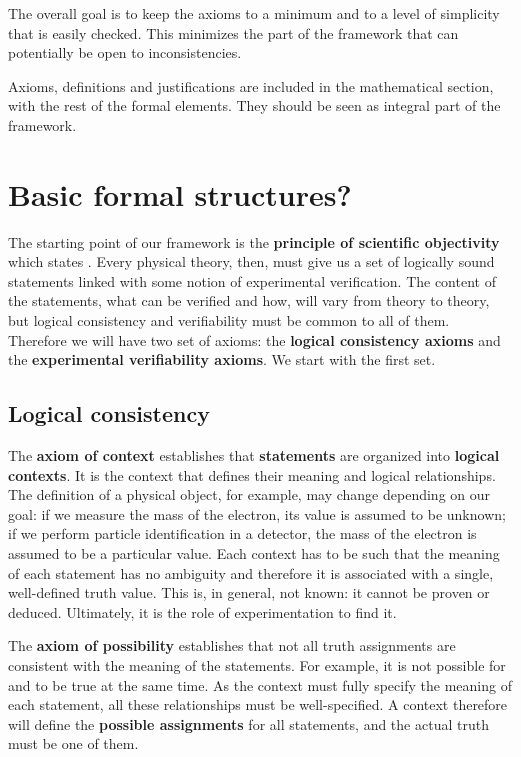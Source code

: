 \documentclass[twocolumn]{article}
\begin{document}
The overall goal is to keep the axioms to a minimum and to a level of simplicity that is easily checked. This minimizes the part of the framework that can potentially be open to inconsistencies.

Axioms, definitions and justifications are included in the mathematical section, with the rest of the formal elements. They should be seen as integral part of the framework.

\section{Basic formal structures?}

The starting point of our framework is the \textbf{principle of scientific objectivity} which states . Every physical theory, then, must give us a set of logically sound statements linked with some notion of experimental verification. The content of the statements, what can be verified and how, will vary from theory to theory, but logical consistency and verifiability must be common to all of them. Therefore we will have two set of axioms: the \textbf{logical consistency axioms} and the \textbf{experimental verifiability axioms}. We start with the first set.

\subsection{Logical consistency}

The \textbf{axiom of context} establishes that \textbf{statements} are organized into \textbf{logical contexts}. It is the context that defines their meaning and logical relationships. The definition of a physical object, for example, may change depending on our goal: if we measure the mass of the electron, its value is assumed to be unknown; if we perform particle identification in a detector, the mass of the electron is assumed to be a particular value. Each context has to be such that the meaning of each statement has no ambiguity and therefore it is associated with a single, well-defined truth value. This is, in general, not known: it cannot be proven or deduced. Ultimately, it is the role of experimentation to find it.

The \textbf{axiom of possibility} establishes that not all truth assignments are consistent with the meaning of the statements. For example, it is not possible for  and  to be true at the same time. As the context must fully specify the meaning of each statement, all these relationships must be well-specified. A context therefore will define the \textbf{possible assignments} for all statements, and the actual truth must be one of them.
\end{document}
